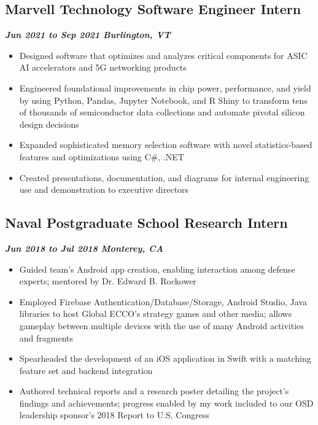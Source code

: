 \documentclass[10pt]{article}
\begin{document}
\begin{raggedright}
        \subsection*{\textbf{\large{Marvell Technology \textendash{} Software Engineer Intern}}} \hfill \textbf{\textit{Jun 2021 to Sep 2021 \textendash{} Burlington, VT}}
        \begin{itemize}
            \item Designed software that optimizes and analyzes critical components for ASIC AI accelerators and 5G networking products
            \item Engineered foundational improvements in chip power, performance, and yield by using Python, Pandas, Jupyter Notebook, and R Shiny to transform tens of thousands of semiconductor data collections and automate pivotal silicon design decisions
            \item Expanded sophisticated memory selection software with novel statistics-based features and optimizations using C\#, .NET
            \item Created presentations, documentation, and diagrams for internal engineering use and demonstration to executive directors
        \end{itemize}

        \subsection*{\textbf{\large{Naval Postgraduate School \textendash{} Research Intern}}} \hfill \textbf{\textit{Jun 2018 to Jul 2018 \textendash{} Monterey, CA}}
        \begin{itemize}
            \item Guided team's Android app creation, enabling interaction among defense experts; mentored by Dr. Edward B. Rockower
            \item Employed Firebase Authentication/Database/Storage, Android Studio, Java libraries to host Global ECCO's strategy games and other media; allows gameplay between multiple devices with the use of many Android activities and fragments
            \item Spearheaded the development of an iOS application in Swift with a matching feature set and backend integration
            \item Authored technical reports and a research poster detailing the project's findings and achievements; progress enabled by my work included to our OSD leadership sponsor's 2018 Report to U.S. Congress
        \end{itemize}


\end{raggedright}
\end{document}
